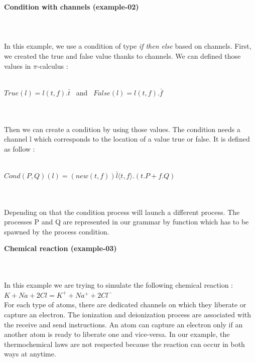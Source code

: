 \documentclass[11pt]{report}
\begin{document}
{}
\tabto{0cm} {\LARGE \textbf{Condition with channels (example-02)}} \\
\vspace*{3pt}
\\
 \\ \\
In this example, we use a condition of type \textit{if then else} based on channels. First, we created the true and false value thanks to channels. We can defined those values in $\pi$-calculus : \\ \\
\centerline{$True(l) = l(t,f). \bar{t}$ \ and \ $False(l) = l(t,f). \bar{f}$} \\
\\ Then we can create a condition by using those values.
The condition needs a channel l which corresponds to the location of a value true or false. It is defined as follow : \\ \\
\centerline{$ Cond(P,Q)(l) = (new (t,f)) \bar{l} \langle t,f \rangle .(t.P + f.Q)$} \\
\\Depending on that the condition process will launch a different process. The processes P and Q are represented in our grammar by function which has to be spawned by the process condition. 

{}
\tabto{0cm} {\LARGE \textbf{Chemical reaction (example-03)}}
\vspace*{3pt}
\vspace*{10pt}

 \\ \\
In this example we are trying to simulate the following chemical reaction : \\
$K + Na + 2Cl = K^+ + Na^+ + 2Cl^-$ \\
For each type of atoms, there are dedicated channels on which they liberate or capture an electron. The ionization and deionization process are associated with the receive and send instructions. An atom can capture an electron only if an another atom is ready to liberate one and vice-versa. In our example, the thermochemical laws are not respected because the reaction can occur in both ways at anytime.  
\end{document}
